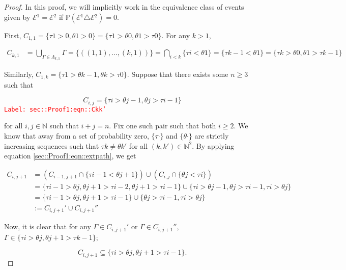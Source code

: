 \documentclass[12pt]{article}
\newcommand{\mb}{\mathbb}
\newcommand{\mc}{\mathcal}
\newcommand{\tr}{\textcolor{red}}
\newcommand{\labe}[1]{\tr{\texttt{Label: #1}}}
\newcommand{\ind}{\hspace{24pt}}
\newcommand{\pr}{\mb{P}}							%
\newcommand{\rt}{\tau}							%
\newcommand{\rtt}{\theta}						%
\renewcommand{\it}{k}							%
\newcommand{\apath}{\Gamma}						%
\newcommand{\pathset}[2]{\Lambda_{#1,#2}}		%
\newcommand{\pathsete}[2]{C_{#1,#2}}			%
\newcommand{\evnt}{\mc{E}}						%
\begin{document}
\begin{proof}
In this proof, we will implicitly work in the equivalence class of events given by \(\evnt{}^1 = \evnt{}^2\) if \(\pr(\evnt{}^1 \triangle \evnt{}^2) = 0\).  

\ind First, \(\pathsete{1}{1} = \{\rt{1} > 0,\rtt{1} > 0\} = \{\rt{1} > \rtt{0},\rtt{1}>\rt{0}\}\). For any \(\it > 1\),

\begin{align*}
\pathsete{\it}{1} &= \bigcup_{\apath{} \in \pathset{\it}{1}} \apath{} = \{((1,1),\dots,(\it,1))\} = \bigcap_{i < \it} \{\rt{i} < \rtt{1}\} = \{\rt{\it-1} < \rtt{1}\} = \{\rt{\it} > \rtt{0},\rtt{1} > \rt{\it-1}\}
\end{align*}

Similarly, \(\pathsete{1}{\it} = \{\rt{1} > \rtt{\it-1}, \rtt{\it} > \rt{0}\}\). Suppose that there exists some \(n\geq 3\) such that

\begin{equation}
\pathsete{i}{j} = \{\rt{i} > \rtt{j-1},\rtt{j} > \rt{i-1}\}
\label{sec::Proof1:eqn::Ckk'}
\end{equation}
\labe{sec::Proof1:eqn::Ckk'}

for all \(i, j\in \mb{N}\) such that \(i+j = n\). Fix one such pair such that both \(i \geq 2\). We know that away from a set of probability zero, \(\{\rt{\cdot}\}\) and \(\{\rtt{\cdot}\}\) are strictly increasing sequences such that \(\rt{\it} \neq \rtt{\it'}\) for all \((\it,\it')\in \mb{N}^2\). By applying equation \eqref{sec::Proof1:eqn::extpath}, we get

\begin{align*}
\pathsete{i}{j+1} &= \left(\pathsete{i-1}{j+1} \cap \{\rt{i - 1} < \rtt{j+1}\}\right) \cup \left(\pathsete{i}{j}\cap \{\rtt{j} < \rt{i}\}\right)\\
&= \{\rt{i - 1} > \rtt{j}, \rtt{j+1} > \rt{i - 2},  \rtt{j+1} > \rt{i -1}\}\cup\{\rt{i} > \rtt{j-1}, \rtt{j} > \rt{i - 1},\rt{i} > \rtt{j}\}\\
&= \{\rt{i - 1} > \rtt{j}, \rtt{j+1} > \rt{i - 1}\}\cup\{\rtt{j} > \rt{i - 1},\rt{i} > \rtt{j}\}\\
&:= \pathsete{i}{j+1}' \cup\pathsete{i}{j+1}''
\end{align*}

Now, it is clear that for any \(\apath{} \in \pathsete{i}{j+1}'\) or \(\apath{} \in \pathsete{i}{j+1}''\), \(\apath{}\in \{\rt{i} > \rtt{j},\rtt{j+1} > \rt{\it-1}\}\);

\[\pathsete{i}{j+1} \subseteq \{\rt{i} > \rtt{j},\rtt{j+1} > \rt{i-1}\}.\]


\end{proof}
\end{document}
